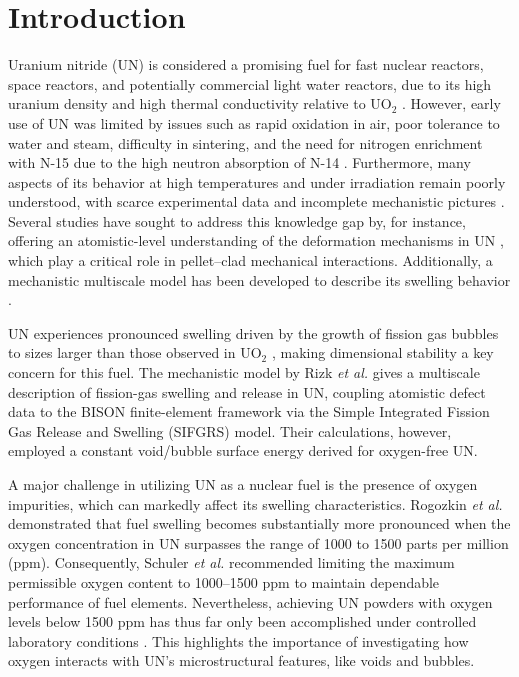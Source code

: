 \documentclass[preprint,12pt,sort&compress]{elsarticle}
\newcommand{\?}{\stackrel{?}{=}}
\begin{document}
\newpage

\linenumbers

\section{Introduction}
\label{intro}

Uranium nitride (UN) is considered a promising fuel for fast nuclear reactors, space reactors, and potentially commercial light water reactors, due to its high uranium density and high thermal conductivity relative to UO$_2$ \cite{Wallenius2020, Uno2020}. However, early use of UN was limited by issues such as rapid oxidation in air, poor tolerance to water and steam, difficulty in sintering, and the need for nitrogen enrichment with N-15 due to the high neutron absorption of N-14 \cite{Wallenius2020, Uno2020}. Furthermore, many aspects of its behavior at high temperatures and under irradiation remain poorly understood, with scarce experimental data and incomplete mechanistic pictures \cite{Wallenius2020, Uno2020}. Several studies have sought to address this knowledge gap by, for instance, offering an atomistic-level understanding of the deformation mechanisms in UN \cite{AbdulHameed2024b, AbdulHameed2025}, which play a critical role in pellet–clad mechanical interactions. Additionally, a mechanistic multiscale model has been developed to describe its swelling behavior \cite{Rizk2025}.

UN experiences pronounced swelling driven by the growth of fission gas bubbles to sizes larger than those observed in UO$_2$ \cite{Ronchi1975, Ronchi1978, Rizk2025}, making dimensional stability a key concern for this fuel. The mechanistic model by Rizk \textit{et al.} \cite{Rizk2025} gives a multiscale description of fission-gas swelling and release in UN, coupling atomistic defect data to the BISON finite-element framework via the Simple Integrated Fission Gas Release and Swelling (SIFGRS) model. Their calculations, however, employed a constant void/bubble surface energy derived for oxygen-free UN.

A major challenge in utilizing UN as a nuclear fuel is the presence of oxygen impurities, which can markedly affect its swelling characteristics. Rogozkin \textit{et al.} \cite{Rogozkin2003} demonstrated that fuel swelling becomes substantially more pronounced when the oxygen concentration in UN surpasses the range of 1000 to 1500 parts per million (ppm). Consequently, Schuler \textit{et al.} \cite{Schuler2017} recommended limiting the maximum permissible oxygen content to 1000--1500 ppm to maintain dependable performance of fuel elements. Nevertheless, achieving UN powders with oxygen levels below 1500 ppm has thus far only been accomplished under controlled laboratory conditions \cite{Schuler2017}. This highlights the importance of investigating how oxygen interacts with UN's microstructural features, like voids and bubbles. 
\end{document}
